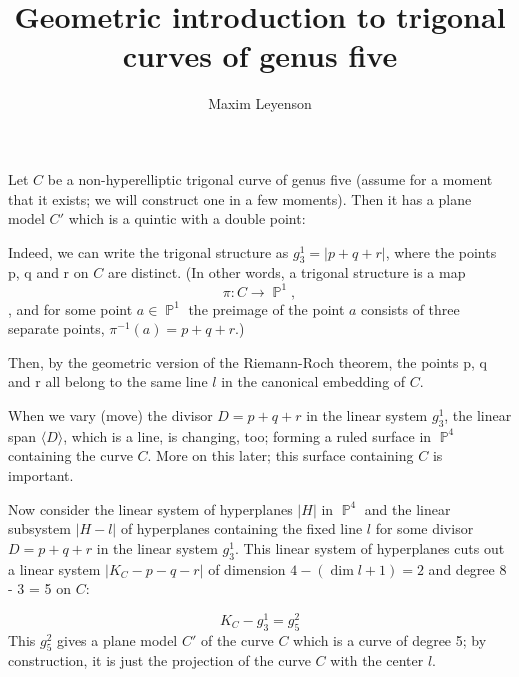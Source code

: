 \documentclass{amsart} %
\newcommand{\<}{\langle }
\renewcommand{\>}{\rangle }
\newcommand{\PP}{\mathop{\mathbb{P}}\nolimits}
\begin{document}

\title{Geometric introduction to trigonal curves of genus five}
\author{Maxim Leyenson}
\date{}   %

\maketitle




\section{}%
\label{sec:section name}

Let $C$ be a non-hyperelliptic trigonal curve of genus five (assume for a moment that it
exists; we will construct one in a few moments). Then it has a plane
model $C'$ which is a quintic with a double point:

Indeed, we can write the trigonal structure as $g_3^1 = |p + q + r|$, where the points p, q and r on $C$ are distinct.
(In other words, a trigonal structure is a map \[
  \pi: C \to \PP^1,
\], and for some point $a \in \PP^1$ the preimage of the point $a$
consists of three separate points, $\pi^{-1}(a) = p + q + r$.)

Then, by the geometric version of the Riemann-Roch theorem, the points p, q and r 
all belong to the same line $l$ in the canonical embedding of $C$. 

When we vary (move) the divisor $D = p + q + r$ in the linear system
$g_3^1$, the linear span $\<D\>$, which is a line,  is changing, too; forming a ruled surface
in $\PP^4$ containing the curve $C$. More on this later; this surface
containing $C$ is important.
  
Now consider the linear system of hyperplanes $|H|$ in $\PP^4$ and the linear subsystem
$|H - l|$ of hyperplanes containing the fixed line $l$ for some
divisor $D = p + q + r $ in the linear system $g_3^1$. This linear
system of hyperplanes cuts out a linear system  
$|K_C - p - q - r| $ of dimension $4 - ( \dim l + 1) = 2$ and degree 8 - 3 = 5 on $C$:

\[
    K_C - g_3^1 = g_5^2
\]
This $g_5^2$ gives a plane model $C'$ of the curve $C$ which is a curve of degree 5;
by construction, it is just the projection of the curve $C$ with the center $l$.
\end{document}
